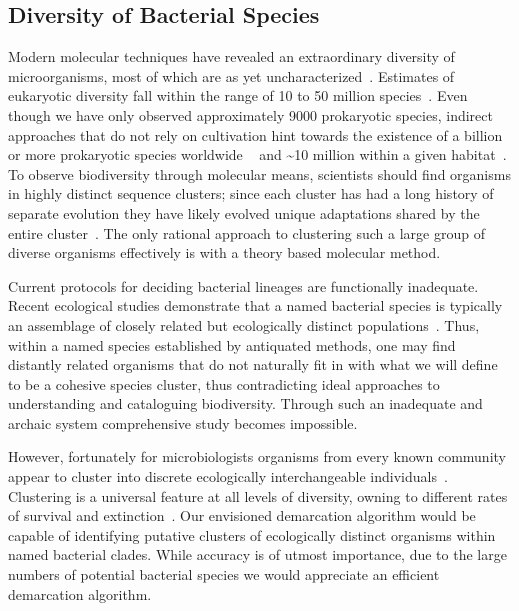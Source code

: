 \subsection{Diversity of Bacterial Species}
Modern molecular techniques have revealed an extraordinary diversity of microorganisms, most of which are as yet uncharacterized~\cite{bohannan2003new}.
Estimates of eukaryotic diversity fall within the range of 10 to 50 million species~\cite{may1988many}. Even though we have only observed approximately 9000 prokaryotic species, indirect approaches that do not rely on cultivation hint towards the existence of a billion or more prokaryotic species worldwide ~\cite{dykhuizen1998santa} and \textasciitilde10 million within a given habitat~\cite{gans2005computational}.
To observe biodiversity through molecular means, scientists should find organisms in highly distinct sequence clusters; since each cluster has had a long history of separate evolution they have likely evolved unique adaptations shared by the entire cluster~\cite{cohan2007systematics}.
The only rational approach to clustering such a large group of diverse organisms effectively is with a theory based molecular method.

Current protocols for deciding bacterial lineages are functionally inadequate.
Recent ecological studies demonstrate that a named bacterial species is typically an assemblage of closely related but ecologically distinct populations~\cite{cohan2007systematics}.
Thus, within a named species established by antiquated methods, one may find distantly related organisms that do not naturally fit in with what we will define to be a cohesive species cluster, thus contradicting ideal approaches to understanding and cataloguing biodiversity.
Through such an inadequate and archaic system comprehensive study becomes impossible.

However, fortunately for microbiologists organisms from every known community appear to cluster into discrete ecologically interchangeable individuals~\cite{cohan2007systematics}.
Clustering is a universal feature at all levels of diversity, owning to different rates of survival and extinction~\cite{darwin1861origin}.
Our envisioned demarcation algorithm would be capable of identifying putative clusters of ecologically distinct organisms within named bacterial clades.
While accuracy is of utmost importance, due to the large numbers of potential bacterial species we would appreciate an efficient demarcation algorithm.

